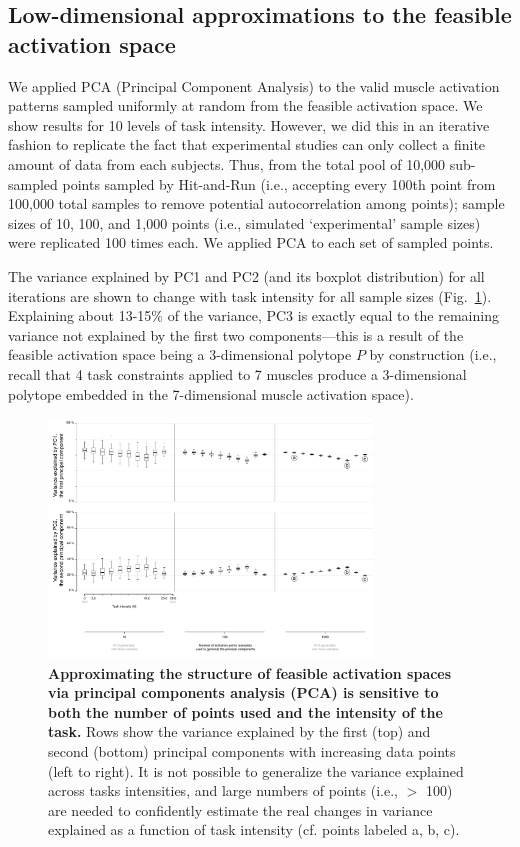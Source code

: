 \documentclass[9pt,twocolumn,twoside,lineno]{pnas-new}
\begin{document}
\subsection*{Low-dimensional approximations to the feasible activation space}

We applied PCA (Principal Component Analysis) to the valid muscle activation patterns sampled uniformly at random from the feasible activation space. We show results for 10 levels of task intensity. However, we did this in an iterative fashion to replicate the fact that experimental studies can only collect a finite amount of data from each subjects. Thus, from the total pool of 10,000 sub-sampled points sampled by Hit-and-Run (i.e., accepting every 100th point from 100,000 total samples to remove potential autocorrelation among points); sample sizes of 10, 100, and 1,000 points (i.e., simulated `experimental' sample sizes) were replicated 100 times each. We applied PCA to each set of sampled points.

The variance explained by PC1 and PC2 (and its boxplot distribution) for all iterations are shown to change with task intensity for all sample sizes (Fig.~\ref{fig:pca_variance_explained}). Explaining about 13-15\% of the variance, PC3 is exactly equal to the remaining variance not explained by the first two components---this is a result of the feasible activation space being a 3-dimensional polytope $P$ by construction (i.e., recall that 4 task constraints applied to 7 muscles produce a 3-dimensional polytope embedded in the 7-dimensional muscle activation space).

\begin{figure}[htbp]
\centering
\includegraphics[width=8.6cm]{numbered_figures/figure_7_pca_variance_explained.pdf}
\caption{\textbf{Approximating the structure of feasible activation spaces via principal components analysis (PCA) is sensitive to both the number of points used and the intensity of the task.} Rows show the variance explained by the first (top) and second (bottom) principal components with increasing data points (left to right). It is not possible to generalize the variance explained across tasks intensities, and large numbers of points (i.e., $>$ 100) are needed to confidently estimate the real changes in variance explained as a function of task intensity (cf. points labeled a, b, c).}
\label{fig:pca_variance_explained}

\end{figure}
\end{document}
